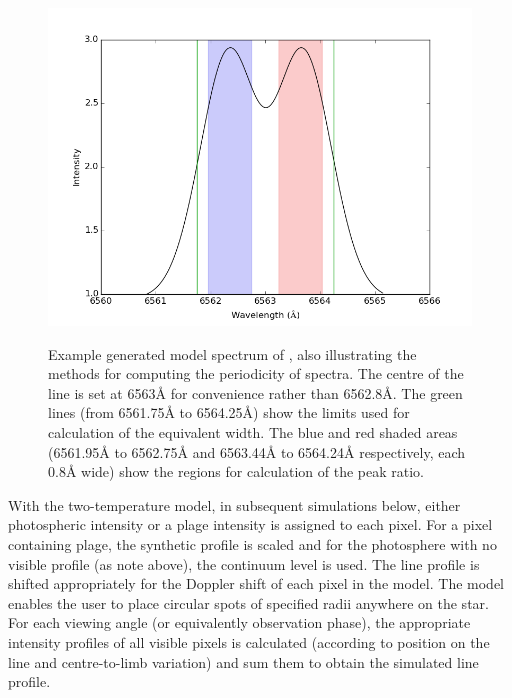 \begin{figure}[!htbp]
\begin{center}
\includegraphics[scale=0.25]{Figures/integregions.png} \\
\end{center}
\caption{Example generated model spectrum of \prox, also illustrating the methods for computing the periodicity of
  spectra.  The centre of the \ha{} line is set at 6563{\AA} for convenience rather than 6562.8\AA{}.  The green lines
  (from 6561.75{\AA} to 6564.25\AA) show the limits used for calculation of the equivalent width. The blue and red
  shaded areas (6561.95{\AA} to 6562.75{\AA} and 6563.44{\AA} to 6564.24{\AA} respectively, each 0.8{\AA} wide) show the
  regions for calculation of the peak ratio.}
\protect\label{fig:integregions}
\end{figure}

With the two-temperature model, in subsequent simulations below, either photospheric intensity or a plage intensity is
assigned to each pixel. For a pixel containing plage, the synthetic {\ha} profile is scaled and for the photosphere with
no visible profile (as note above), the continuum level is used. The line profile is shifted appropriately for the
Doppler shift of each pixel in the model. The model enables the user to place circular spots of specified radii anywhere
on the star. For each viewing angle (or equivalently observation phase), the appropriate intensity profiles of all
visible pixels is calculated (according to position on the line and centre-to-limb variation) and sum them to obtain
the simulated line profile.

